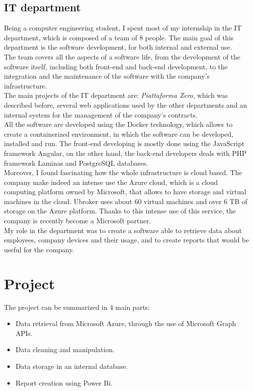 \documentclass[12pt, a4paper, oneside]{article}
\begin{document}
\subsection{IT department}
Being a computer engineering student, I spent most of my internship in the IT department, which is composed of a team of 8 people. The main goal of this department is the software development, 
for both internal and external use.\\ 
The team covers all the aspects of a software life, from the development of the software itself, including both front-end and back-end development, to the integration and the maintenance of the software with the company's 
infrastructure.\\
The main projects of the IT department are: \emph{Piattaforma Zero}, which was described before, several web applications used by the other departments and an internal system for the management of the company's contracts.\\
All the software are developed using the Docker technology, which allows to create a containerized environment, in which the software can be developed, installed and run. The front-end developing is mostly done
using the JavaScript framework Angular, on the other hand, the back-end developers deals with PHP framework Laminas and PostgreSQL databases.\\
Moreover, I found fascinating how the whole infrastructure is cloud based. The company make indeed an intense use the Azure cloud, which is a cloud computing platform owned by Microsoft, that allows
to have storage and virtual machines in the cloud. Ubroker uses about 60 virtual machines and over 6 TB of storage on the Azure platform. Thanks to this intense use of this service, the company is recently
become a Microsoft partner.\\
My role in the department was to create a software able to retrieve data about employees, company devices and their usage, and to create reports that would be useful for the company.

\newpage
\section{Project}
The project can be summarized in 4 main parts:
\begin{itemize}
    \item Data retrieval from Microsoft Azure, through the use of Microsoft Graph APIs.
    \item Data cleaning and manipulation.
    \item Data storage in an internal database.
    \item Report creation using Power Bi.
\end{itemize}
\end{document}
